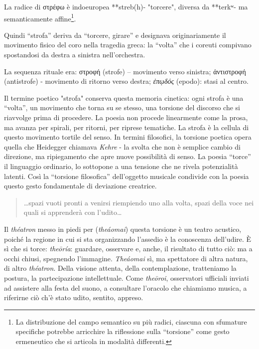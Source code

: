 \documentclass{../../lib/gs}
\begin{document}
La radice di στρέφω è indoeuropea **streb(h)- "torcere", diversa da **terkʷ- ma
semanticamente affine\footnote{La distribuzione del campo semantico su più radici, ciascuna con sfumature
specifiche potrebbe arricchire la riflessione sulla “torsione” come gesto
ermeneutico che si articola in modalità differenti.}.

Quindi “strofa” deriva da “torcere, girare” e designava originariamente il
movimento fisico del coro nella tragedia greca: la “volta” che i coreuti
compivano spostandosi da destra a sinistra nell'orchestra.

La sequenza rituale era: \textgreek{στροφή} (strofe) – movimento verso sinistra;
\textgreek{ἀντιστροφή} (antistrofe) - movimento di ritorno verso destra;
\emph{ἐπῳδός} (epodo): stasi al centro.

Il termine poetico "strofa" conserva questa memoria cinetica: ogni strofa è una
“volta”, un movimento che torna su se stesso, una torsione del discorso che si
riavvolge prima di procedere. La poesia non procede linearmente come la prosa,
ma avanza per spirali, per ritorni, per riprese tematiche. La strofa è la
cellula di questo movimento tortile del senso. In termini filosofici, la
torsione poetica opera quella che Heidegger chiamava \emph{Kehre} - la svolta
che non è semplice cambio di direzione, ma ripiegamento che apre nuove
possibilità di senso. La poesia “torce” il linguaggio ordinario, lo sottopone a
una tensione che ne rivela potenzialità latenti. Così la “torsione filosofica”
dell'oggetto musicale condivide con la poesia questo gesto fondamentale di
deviazione creatrice.

\begin{quote}
\begin{sf}
\small
\ldots spazi vuoti pronti a venirsi riempiendo uno alla volta, spazi della voce
nei quali si apprenderà con l'udito\ldots~\cite{zambrano1991}
\end{sf}
\end{quote}

Il \emph{théatron} messo in piedi per (\emph{theáomai}) questa torsione è un
teatro acustico, poiché la regione in cui si sta organizzando l'assedio è la
conoscenza dell'udire. È sì che si torce: \emph{theōría}: guardare, osservare e,
anche, il risultato di tutto ciò: ma a occhi chiusi, spegnendo l'immagine.
\emph{Theáomai} sì, ma spettatore di altra natura, di altro \emph{théatron}.
Della visione attenta, della contemplazione, tratteniamo la postura, la
partecipazione intellettuale. Come \emph{theōroi}, osservatori ufficiali inviati
ad assistere alla festa del suono, a consultare l'oracolo che chiamiamo musica,
a riferirne ciò ch'è stato udito, sentito, appreso.
\end{document}
